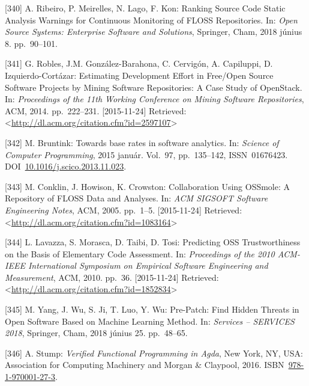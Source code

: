 \documentclass[12pt,magyar,a4paper,oneside]{scrreprt}
\newenvironment{cslreferences}%
  {}%
  {\par}
\begin{document}
\begin{cslreferences}
\leavevmode\hypertarget{ref-ribeiro_ranking_2018}{}%
{[}340{]} A. Ribeiro, P. Meirelles, N. Lago, F. Kon: Ranking Source Code
Static Analysis Warnings for Continuous Monitoring of FLOSS
Repositories. In: \emph{Open Source Systems: Enterprise Software and
Solutions}, Springer, Cham, 2018 június 8. pp.~90--101.

\leavevmode\hypertarget{ref-robles_estimating_2014}{}%
{[}341{]} G. Robles, J.M. González-Barahona, C. Cervigón, A. Capiluppi,
D. Izquierdo-Cortázar: Estimating Development Effort in Free/Open Source
Software Projects by Mining Software Repositories: A Case Study of
OpenStack. In: \emph{Proceedings of the 11th Working Conference on
Mining Software Repositories}, ACM, 2014. pp.~222--231. {[}2015-11-24{]}
Retrieved:
\textless{}\url{http://dl.acm.org/citation.cfm?id=2597107}\textgreater{}

\leavevmode\hypertarget{ref-bruntink_towards_2015}{}%
{[}342{]} M. Bruntink: Towards base rates in software analytics. In:
\emph{Science of Computer Programming}, 2015 január. Vol.~97,
pp.~135--142, ISSN~01676423.
DOI~\href{https://doi.org/10.1016/j.scico.2013.11.023}{10.1016/j.scico.2013.11.023}.

\leavevmode\hypertarget{ref-conklin_collaboration_2005}{}%
{[}343{]} M. Conklin, J. Howison, K. Crowston: Collaboration Using
OSSmole: A Repository of FLOSS Data and Analyses. In: \emph{ACM SIGSOFT
Software Engineering Notes}, ACM, 2005. pp.~1--5. {[}2015-11-24{]}
Retrieved:
\textless{}\url{http://dl.acm.org/citation.cfm?id=1083164}\textgreater{}

\leavevmode\hypertarget{ref-lavazza_predicting_2010}{}%
{[}344{]} L. Lavazza, S. Morasca, D. Taibi, D. Tosi: Predicting OSS
Trustworthiness on the Basis of Elementary Code Assessment. In:
\emph{Proceedings of the 2010 ACM-IEEE International Symposium on
Empirical Software Engineering and Measurement}, ACM, 2010. pp.~36.
{[}2015-11-24{]} Retrieved:
\textless{}\url{http://dl.acm.org/citation.cfm?id=1852834}\textgreater{}

\leavevmode\hypertarget{ref-yang_pre-patch_2018}{}%
{[}345{]} M. Yang, J. Wu, S. Ji, T. Luo, Y. Wu: Pre-Patch: Find Hidden
Threats in Open Software Based on Machine Learning Method. In:
\emph{Services -- SERVICES 2018}, Springer, Cham, 2018 június 25.
pp.~48--65.

\leavevmode\hypertarget{ref-stump_verified_2016}{}%
{[}346{]} A. Stump: \emph{Verified Functional Programming in Agda}, New
York, NY, USA: Association for Computing Machinery and Morgan \&
Claypool, 2016.
ISBN~\href{https://worldcat.org/isbn/978-1-970001-27-3}{978-1-970001-27-3}.


\end{cslreferences}
\end{document}
